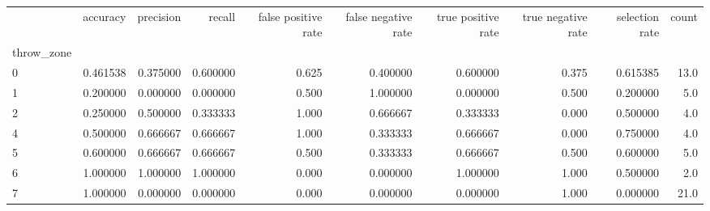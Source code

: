 \begin{tabular}{lrrrrrrrrr}
\toprule
{} &  accuracy &  precision &    recall &  false positive rate &  false negative rate &  true positive rate &  true negative rate &  selection rate &  count \\
throw\_zone &           &            &           &                      &                      &                     &                     &                 &        \\
\midrule
0          &  0.461538 &   0.375000 &  0.600000 &                0.625 &             0.400000 &            0.600000 &               0.375 &        0.615385 &   13.0 \\
1          &  0.200000 &   0.000000 &  0.000000 &                0.500 &             1.000000 &            0.000000 &               0.500 &        0.200000 &    5.0 \\
2          &  0.250000 &   0.500000 &  0.333333 &                1.000 &             0.666667 &            0.333333 &               0.000 &        0.500000 &    4.0 \\
4          &  0.500000 &   0.666667 &  0.666667 &                1.000 &             0.333333 &            0.666667 &               0.000 &        0.750000 &    4.0 \\
5          &  0.600000 &   0.666667 &  0.666667 &                0.500 &             0.333333 &            0.666667 &               0.500 &        0.600000 &    5.0 \\
6          &  1.000000 &   1.000000 &  1.000000 &                0.000 &             0.000000 &            1.000000 &               1.000 &        0.500000 &    2.0 \\
7          &  1.000000 &   0.000000 &  0.000000 &                0.000 &             0.000000 &            0.000000 &               1.000 &        0.000000 &   21.0 \\
\bottomrule
\end{tabular}

